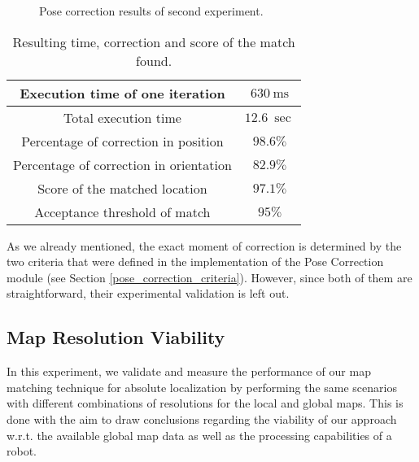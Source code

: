 \begin{figure}[h!]
    \centering
    \setlength\figureheight{8cm}
    \setlength\figurewidth{12cm}
    
    \caption[Pose correction error over time plot]{
        Pose correction results of second experiment.
    }
    \label{fig:pose_correction_error}
\end{figure}

\begin{table}[h!]
    \centering
    \begin{tabular}{| c | c |}
        \hline
        Execution time of one iteration & $\SI{630}{\milli \second}$ \\
        \hline
        Total execution time & $\SI{12.6}{\sec}$ \\
        \hline
        \hline
        Percentage of correction in position & $98.6\%$ \\
        \hline
        Percentage of correction in orientation & $82.9\%$ \\
        \hline
        \hline
        Score of the matched location & $97.1\%$ \\
        \hline
        Acceptance threshold of match & $95\%$ \\
        \hline
    \end{tabular}
    \caption[Results of pose correction for absolute localization]{
        Resulting time, correction and score of the match found.
    }
    \label{table:pose_correction}
\end{table}

As we already mentioned, the exact moment of correction is determined by
the two criteria that were defined in the implementation of the Pose Correction
module (see Section \ref{pose_correction_criteria}).
However, since both of them are straightforward, their experimental
validation is left out.

\subsection{Map Resolution Viability}

In this experiment, we validate and measure the performance of our map
matching technique for absolute localization by performing the same
scenarios with different combinations of resolutions for the local and
global maps.
This is done with the aim to draw conclusions regarding the viability
of our approach w.r.t. the available global map data as well as
the processing capabilities of a robot.

